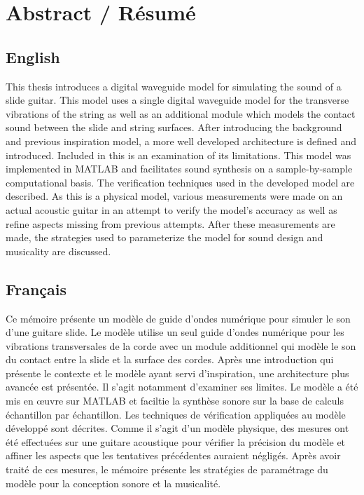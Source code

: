 \documentclass[../main.tex]{subfiles}
\begin{document}
\chapter*{Abstract / Résumé}
\section*{English}
This thesis introduces a digital waveguide model for simulating the sound of a slide guitar. This model uses a single digital waveguide model for the transverse vibrations of the string as well as an additional module which models the contact sound between the slide and string surfaces. After introducing the background and previous inspiration model, a more well developed architecture is defined and introduced. Included in this is an examination of its limitations. This model was implemented in MATLAB and facilitates sound synthesis on a sample-by-sample computational basis. The verification techniques used in the developed model are described. As this is a physical model, various measurements were made on an actual acoustic guitar in an attempt to verify the model's accuracy as well as refine aspects missing from previous attempts. After these measurements are made, the strategies used to parameterize the model for sound design and musicality are discussed.

\section*{Français}
Ce mémoire présente un modèle de guide d’ondes numérique pour simuler le son d’une guitare slide. Le modèle utilise un seul guide d’ondes numérique pour les vibrations transversales de la corde avec un module additionnel qui modèle le son du contact entre la slide et la surface des cordes. Après une introduction qui présente le contexte et le modèle ayant servi d’inspiration, une architecture plus avancée est présentée. Il s'agit notamment d’examiner ses limites. Le modèle a été mis en œuvre sur MATLAB et faciltie la synthèse sonore sur la base de calculs échantillon par échantillon. Les techniques de vérification appliquées au modèle développé sont décrites. Comme il  s’agit d’un modèle physique, des mesures ont été effectuées sur une guitare acoustique pour vérifier la précision du modèle et affiner les aspects que les tentatives précédentes auraient négligés. Après avoir traité de ces mesures, le mémoire présente les stratégies de paramétrage du modèle pour la conception sonore et la musicalité.
\end{document}

